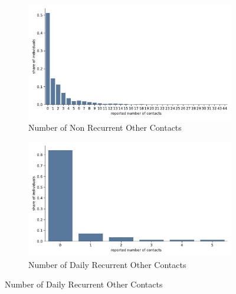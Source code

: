 \begin{figure}
    \centering

    \begin{subfigure}[b]{0.25\textwidth}
        \centering

        \includegraphics[width=\textwidth]{figures/results/figures/data/distributions_of_the_number_of_contacts/other_non_recurrent}
        \caption{Number of Non Recurrent Other Contacts}
        \label{n_contacts_other_non_recurrent}
    \end{subfigure}

    \hfill

    \begin{subfigure}[b]{0.25\textwidth}
        \centering
        \includegraphics[width=\textwidth]{figures/results/figures/data/distributions_of_the_number_of_contacts/other_recurrent_daily}
        \caption{Number of Daily Recurrent Other Contacts}
        \label{n_contacts_other_daily_recurrent}
    \end{subfigure}

    \hfill


\end{figure}
